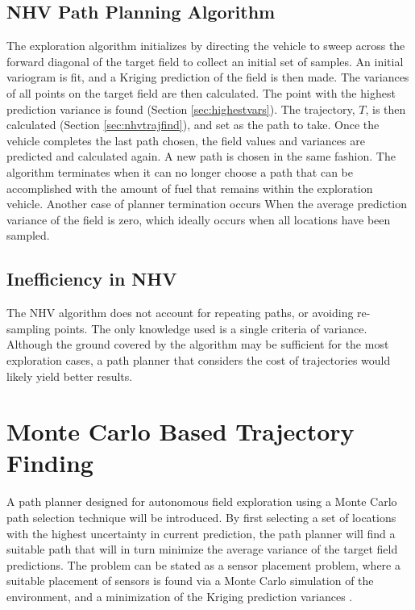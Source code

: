 \subsection{NHV Path Planning Algorithm}
The exploration algorithm initializes by directing the vehicle to sweep across the forward diagonal of the target field to collect an initial set of samples. An initial variogram is fit, and a Kriging prediction of the field is then made. The variances of all points on the target field are then calculated. The point with the highest prediction variance is found (Section \ref{sec:highestvars}). The trajectory, $T$, is then calculated (Section \ref{sec:nhvtrajfind}), and set as the path to take. Once the vehicle completes the last path chosen, the field values and variances are predicted and calculated again. A new path is chosen in the same fashion. The algorithm terminates when it can no longer choose a path that can be accomplished with the amount of fuel that remains within the exploration vehicle. Another case of planner termination occurs When the average prediction variance of the field is zero, which ideally occurs when all locations have been sampled.

\subsection{Inefficiency in NHV}
The NHV algorithm does not account for repeating paths, or avoiding re-sampling points. The only knowledge used is a single criteria of variance. Although the ground covered by the algorithm may be sufficient for the most exploration cases, a path planner that considers the cost of trajectories would likely yield better results.

\section{Monte Carlo Based Trajectory Finding}
A path planner designed for autonomous field exploration using a Monte Carlo path selection technique will be introduced. By first selecting a set of locations with the highest uncertainty in current prediction, the path planner will find a suitable path that will in turn minimize the average variance of the target field predictions. The problem can be stated as a sensor placement problem, where a suitable placement of sensors is found via a Monte Carlo simulation of the environment, and a minimization of the Kriging prediction variances \cite{kriging:sensorplacement}.

